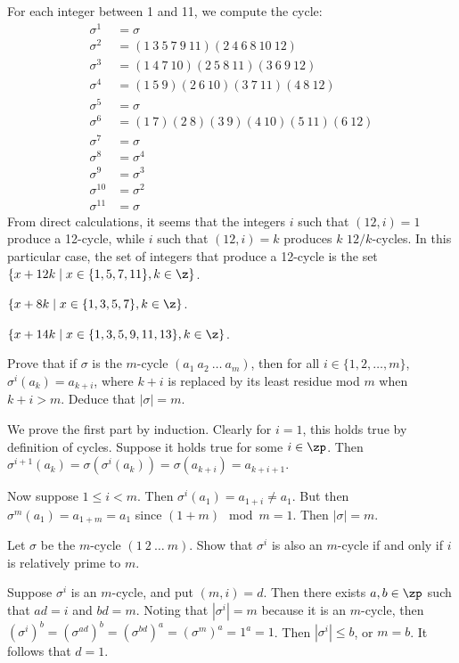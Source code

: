 \begin{problems}
\begin{solalph}
        For each integer between 1 and 11, we compute the cycle:
        \begin{align*}
            \sigma^1 & = \sigma \\
            \sigma^2 & = (1\ 3\ 5\ 7\ 9\ 11)(2\ 4\ 6\ 8\ 10\ 12)\\
            \sigma^3 & = (1\ 4\ 7\ 10)(2\ 5\ 8\ 11)(3\ 6\ 9\ 12)\\
            \sigma^4 & = (1\ 5\ 9)(2\ 6\ 10)(3\ 7\ 11)(4\ 8\ 12)\\
            \sigma^5 & = \sigma \\
            \sigma^6 & = (1\ 7)(2\ 8)(3\ 9)(4\ 10)(5\ 11)(6\ 12) \\
            \sigma^7 & = \sigma \\
            \sigma^8 & = \sigma^4 \\
            \sigma^9 & = \sigma^3 \\
            \sigma^{10} & = \sigma^2\\
            \sigma^{11} & = \sigma
        \end{align*}
        From direct calculations, it seems that the integers $i$ such that $(12, i) = 1$ produce a 12-cycle, while $i$ such that $(12, i) = k$ produces $k$ $12/k$-cycles. In this particular case, the set of integers that produce a 12-cycle is the set $\{x + 12k \mid x \in \{1, 5, 7, 11\}, k \in \z\}$.
        \item $\{x + 8k \mid x \in \{1, 3, 5, 7\}, k \in \z\}$.
        \item $\{x + 14k \mid x \in \{1, 3, 5, 9, 11, 13\}, k \in \z\}$.
    \end{solalph}
    \item Prove that if $\sigma$ is the $m$-cycle $(a_1\ a_2\ \dots\ a_m)$, then for all $i \in \{1,2,\dots,m\}$, $\sigma^i(a_k) = a_{k+i}$, where $k+i$ is replaced by its least residue mod $m$ when $k+i > m$. Deduce that $|\sigma| = m$.
    \begin{sol}
        We prove the first part by induction. Clearly for $i = 1$, this holds true by definition of cycles. Suppose it holds true for some $i \in \zp$. Then $\sigma^{i + 1}(a_k) = \sigma(\sigma^i(a_k)) = \sigma(a_{k + i}) = a_{k + i + 1}$.
        
        Now suppose $1 \leq i < m$. Then $\sigma^i(a_1) = a_{1 + i} \neq a_1$. But then $\sigma^m(a_1) = a_{1 + m} = a_1$ since $(1 + m) \mod m = 1$. Then $|\sigma| = m$.
    \end{sol}
    \item Let $\sigma$ be the $m$-cycle $(1\ 2\ \dots\ m)$. Show that $\sigma^i$ is also an $m$-cycle if and only if $i$ is relatively prime to $m$.
    \begin{sol}
        Suppose $\sigma^i$ is an $m$-cycle, and put $(m, i) = d$. Then there exists $a, b \in \zp$ such that $ad = i$ and $bd = m$. Noting that $|\sigma^i| = m$ because it is an $m$-cycle, then $(\sigma^i)^b = (\sigma^{ad})^b = (\sigma^{bd})^a = (\sigma^m)^a = 1^a = 1$. Then $|\sigma^i| \leq b$, or $m = b$. It follows that $d = 1$.
        

\end{sol}
\end{problems}
